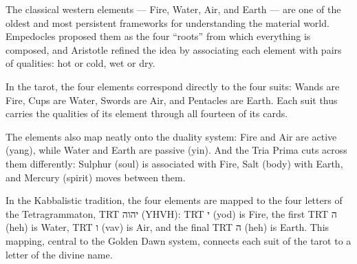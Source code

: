 \documentclass[openright]{book}
\begin{document}
\begin{center}
\end{center}
\vfill\null

\newpage

\noindent The classical western elements --- Fire, Water, Air, and Earth --- are one of the oldest and most persistent frameworks for understanding the material world. Empedocles proposed them as the four ``roots'' from which everything is composed, and Aristotle refined the idea by associating each element with pairs of qualities: hot or cold, wet or dry.

In the tarot, the four elements correspond directly to the four suits: Wands are Fire, Cups are Water, Swords are Air, and Pentacles are Earth. Each suit thus carries the qualities of its element through all fourteen of its cards.

The elements also map neatly onto the duality system: Fire and Air are active (yang), while Water and Earth are passive (yin). And the Tria Prima cuts across them differently: Sulphur (soul) is associated with Fire, Salt (body) with Earth, and Mercury (spirit) moves between them.

In the Kabbalistic tradition, the four elements are mapped to the four letters of the Tetragrammaton, {\hebrewfont\textdir TRT יהוה} (YHVH): {\hebrewfont\textdir TRT י} (yod) is Fire, the first {\hebrewfont\textdir TRT ה} (heh) is Water, {\hebrewfont\textdir TRT ו} (vav) is Air, and the final {\hebrewfont\textdir TRT ה} (heh) is Earth. This mapping, central to the Golden Dawn system, connects each suit of the tarot to a letter of the divine name.
\end{document}

